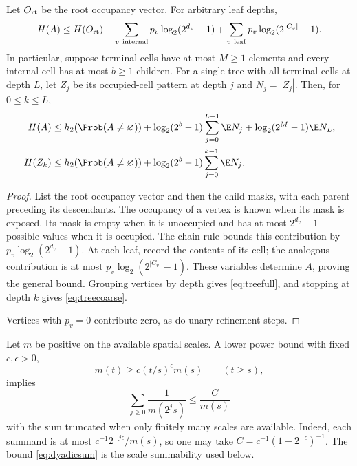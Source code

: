 \begin{lemma}\label{cor:forestcost}
Let $O_{\rm rt}$ be the root occupancy vector. For arbitrary leaf depths,
\[
 H(A)\le H(O_{\rm rt})
 +\sum_{v\ \mathrm{internal}}p_v\log_2(2^{d_v}-1)
 +\sum_{v\ \mathrm{leaf}}p_v\log_2(2^{|C_v|}-1).
\]
In particular, suppose terminal cells have at most $M\ge1$ elements and
every internal cell has at most $b\ge1$ children. For a single tree with
all terminal cells at depth $L$, let $Z_j$ be its occupied-cell pattern
at depth $j$ and $N_j=|Z_j|$. Then, for $0\le k\le L$,
\begin{align}
 H(A)&\le h_2(\Prob(A\ne\varnothing))
 +\log_2(2^b-1)\sum_{j=0}^{L-1}\E N_j
 +\log_2(2^M-1)\E N_L,\label{eq:treefull}\\
 H(Z_k)&\le h_2(\Prob(A\ne\varnothing))
 +\log_2(2^b-1)\sum_{j=0}^{k-1}\E N_j.\label{eq:treecoarse}
\end{align}
\end{lemma}
\begin{proof}
List the root occupancy vector and then the child masks, with each
parent preceding its descendants. The occupancy of a vertex is known
when its mask is exposed. Its mask is empty when it is unoccupied and
has at most $2^{d_v}-1$ possible values when it is occupied. The chain
rule bounds this contribution by $p_v\log_2(2^{d_v}-1)$. At each leaf,
record the contents of its cell; the analogous contribution is at most
$p_v\log_2(2^{|C_v|}-1)$. These variables determine $A$, proving the
general bound. Grouping vertices by depth gives \eqref{eq:treefull},
and stopping at depth $k$ gives \eqref{eq:treecoarse}.

Vertices with $p_v=0$ contribute zero, as do unary refinement steps.
\end{proof}

Let $m$ be positive on the available spatial scales. A lower power bound
with fixed $c,\epsilon>0$,
\begin{equation}\label{eq:massgrowth}
 m(t)\ge c(t/s)^\epsilon m(s)\qquad(t\ge s),
\end{equation}
implies
\begin{equation}\label{eq:dyadicsum}
 \sum_{j\ge0}\frac1{m(2^js)}\le\frac{C}{m(s)}
\end{equation}
with the sum truncated when only finitely many scales are available.
Indeed, each summand is at most $c^{-1}2^{-j\epsilon}/m(s)$, so one may
take $C=c^{-1}(1-2^{-\epsilon})^{-1}$.
The bound \eqref{eq:dyadicsum} is the scale summability used below.

